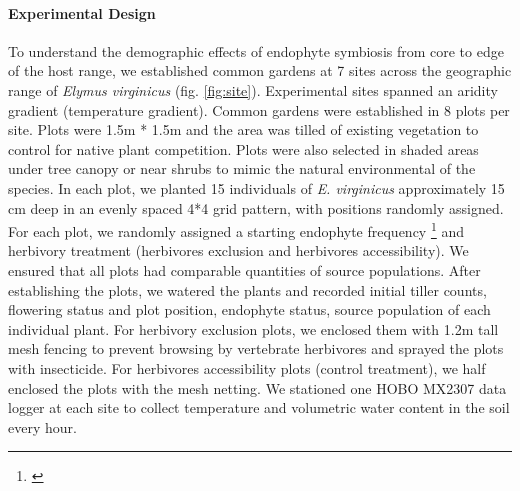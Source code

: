 \documentclass[11pt]{article}
\newcommand{\jacob}[2]{{\color{blue}{#1}}\footnote{\textit{\color{blue}{#2}}}}
\begin{document}
\paragraph {Experimental Design} 
To understand the demographic effects of endophyte symbiosis from core to edge of the host range, we established  common gardens at 7 sites across the geographic range of \emph {Elymus virginicus} (fig. \ref{fig:site}).
Experimental sites spanned an aridity gradient (temperature gradient).
Common gardens were established in 8 plots per site. 
Plots were 1.5m * 1.5m and the area was tilled of existing vegetation to control for native plant competition.
Plots were also selected in shaded areas under tree canopy or near shrubs to mimic the natural environmental of the species.
In each plot,  we planted 15 individuals  of \emph{E. virginicus} approximately 15 cm deep in an evenly spaced 4*4 grid pattern, with positions randomly assigned. 
For each plot, we randomly assigned a starting endophyte frequency  \jacob{(80\%, 60\%, 40\%, 20\%)}{Do we need a schematic of one replicate
of the experimental design?} and herbivory treatment (herbivores exclusion and herbivores accessibility). 
We ensured that all plots had comparable quantities of source populations.
After establishing the plots, we watered the plants and recorded initial tiller counts, flowering status and plot position,  endophyte status, source population of each individual plant. 
For herbivory exclusion plots, we enclosed them with 1.2m tall mesh fencing to prevent browsing by vertebrate herbivores and sprayed the plots with insecticide. 
For herbivores accessibility plots (control treatment), we half enclosed the plots with the mesh netting.
We stationed one HOBO MX2307 data logger at each site to collect temperature and volumetric water content in the soil every hour. 
\end{document}
